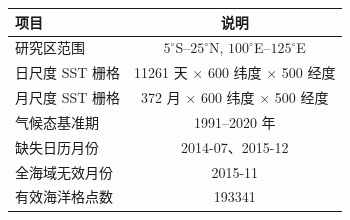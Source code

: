 \begin{tabular}{lc}
\hline
项目 & 说明 \\
\hline
研究区范围 & $5^{\circ}$S--$25^{\circ}$N, $100^{\circ}$E--$125^{\circ}$E \\
日尺度 SST 栅格 & 11261 天 $\times$ 600 纬度 $\times$ 500 经度 \\
月尺度 SST 栅格 & 372 月 $\times$ 600 纬度 $\times$ 500 经度 \\
气候态基准期 & 1991--2020 年 \\
缺失日历月份 & 2014-07、2015-12 \\
全海域无效月份 & 2015-11 \\
有效海洋格点数 & 193341 \\
\hline
\end{tabular}
